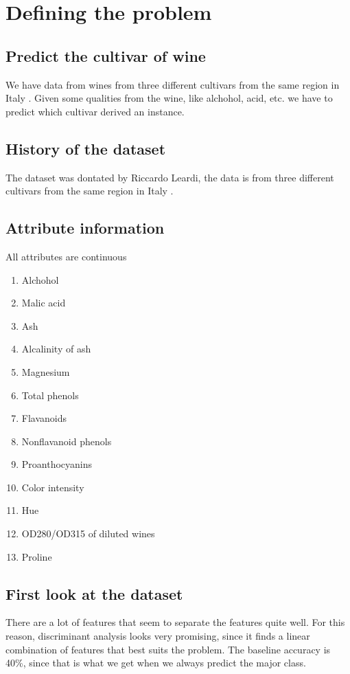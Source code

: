 \chapter{Defining the problem}

\section{Predict the cultivar of wine}
We have data from wines from three different cultivars from the same region in Italy \cite{info}. Given some qualities from the wine, like alchohol, acid, etc. we have to predict which cultivar derived an instance.

\section{History of the dataset}
The dataset was dontated by Riccardo Leardi, the data is from three different cultivars from the same region in Italy \cite{info}.

\section{Attribute information}
All attributes are continuous
\begin{enumerate}
    \item Alchohol 
    \item Malic acid
    \item Ash
    \item Alcalinity of ash
    \item Magnesium
    \item Total phenols 
    \item Flavanoids
    \item Nonflavanoid phenols
    \item Proanthocyanins 
    \item Color intensity 
    \item Hue 
    \item OD280/OD315 of diluted wines 
    \item Proline
\end{enumerate}

\section{First look at the dataset}
There are a lot of features that seem to separate the features quite well. For this reason, discriminant analysis looks very promising, since it finds a linear combination of features that best suits the problem. The baseline accuracy is 40\%, since that is what we get when we always predict the major class.

